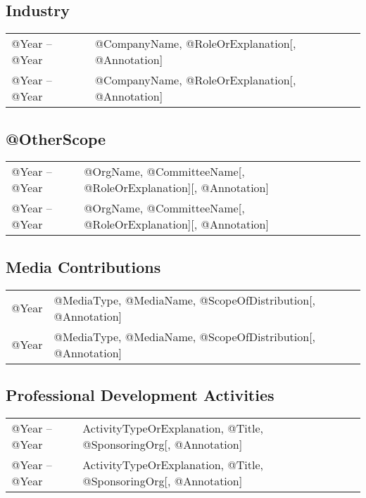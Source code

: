 \documentclass[10pt]{article}
\begin{document}
\begin{IOWA ONLY}
\subsection*{Industry}

\begin{tabular}{l@{\quad\ }p{34em}} 
 @Year -- @Year 
 & @CompanyName, @RoleOrExplanation[, @Annotation]
 \\[.5ex]
 @Year -- @Year 
 & @CompanyName, @RoleOrExplanation[, @Annotation]
\end{tabular}

\subsection*{@OtherScope}

\begin{tabular}{l@{\quad\ }p{34em}} 
 @Year -- @Year 
 & @OrgName, @CommitteeName[, @RoleOrExplanation][, @Annotation]
 \\[.5ex]
 @Year -- @Year 
 & @OrgName, @CommitteeName[, @RoleOrExplanation][, @Annotation]
\end{tabular}

\subsection*{Media Contributions}

\begin{tabular}{l@{\quad\ }p{34em}} 
 @Year  & @MediaType, @MediaName, @ScopeOfDistribution[, @Annotation]
 \\[.5ex]
 @Year  & @MediaType, @MediaName, @ScopeOfDistribution[, @Annotation]
\end{tabular}

\subsection*{Professional Development Activities}

\begin{tabular}{l@{\quad\ }p{34em}} 
 @Year -- @Year 
 & ActivityTypeOrExplanation, @Title, @SponsoringOrg[, @Annotation]
 \\[.5ex]
 @Year -- @Year 
 & ActivityTypeOrExplanation, @Title, @SponsoringOrg[, @Annotation]
\end{tabular}

\end{IOWA ONLY}
\end{document}
